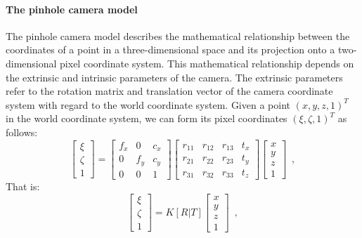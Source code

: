 \paragraph{The pinhole camera model}
The pinhole camera model describes the mathematical relationship between the coordinates of a point in a three-dimensional space and its projection onto a two-dimensional pixel coordinate system. This mathematical relationship depends on the extrinsic and intrinsic parameters of the camera. The extrinsic parameters refer to the rotation matrix and translation vector of the camera coordinate system with regard to the world coordinate system.
Given a point $(x, y, z, 1)^{T}$ in the world coordinate system, we can form its pixel coordinates $(\xi, \zeta, 1)^{T}$ as follows:
\begin{equation} \label{pinhole}
    \begin{bmatrix} \xi\\ \zeta\\ 1 \end{bmatrix} = \begin{bmatrix}
        f_x & 0   & c_x\\ 
        0   & f_y & c_y \\ 
        0   & 0   & 1 
        \end{bmatrix}
        \begin{bmatrix}
        r_{11}& r_{12} & r_{13} & t_{x} \\ 
        r_{21}& r_{22} & r_{23} & t_{y} \\
        r_{31}& r_{32} & r_{33} & t_{z}
        \end{bmatrix}
        \begin{bmatrix} x\\ y\\ z \\ 1 \end{bmatrix}
        \enspace,
\end{equation}
That is:
\begin{equation}
    \begin{bmatrix} \xi\\ \zeta\\ 1 \end{bmatrix} = K[R|T]
    \begin{bmatrix} x\\ y\\ z \\ 1 \end{bmatrix}
        \enspace,
\end{equation}

